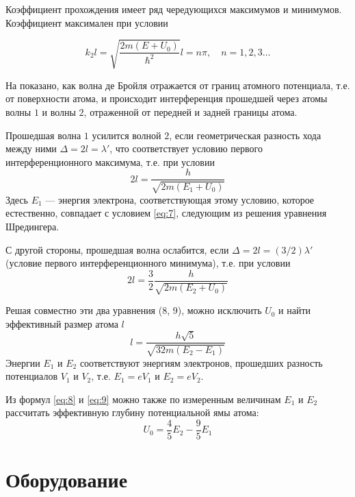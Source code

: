 \documentclass[a4paper, 12pt]{article}
\begin{document}
Коэффициент прохождения имеет ряд чередующихся максимумов и минимумов.
Коэффициент максимален при условии

\begin{equation}
    k_2 l = \sqrt{ \frac{2m (E+U_0)}{\hbar^2} }l = n \pi, \hspace{1em} n =
    1, 2, 3\ldots
    \label{eq:7}
\end{equation}

На  показано, как волна де Бройля отражается от границ
атомного потенциала, т.е. от поверхности атома, и происходит
интерференция прошедшей через атомы волны $1$ и волны $2$, отраженной
от передней и задней границы атома.

Прошедшая волна $1$ усилится волной $2$, если геометрическая разность
хода между ними $\Delta = 2l = \lambda'$, что соответствует условию
первого интерференционного максимума, т.е. при условии
\begin{equation}
    2l = \frac{h}{\sqrt{2m (E_1 + U_0)}}
    \label{eq:8}
\end{equation}
Здесь $E_1$ --- энергия электрона, соответствующая этому условию,
которое естественно, совпадает с условием \eqref{eq:7}, следующим из
решения уравнения Шредингера.

С другой стороны, прошедшая волна ослабится, если $\Delta = 2l =
(3/2)\lambda'$ (условие первого интерференционного минимума), т.е. при
условии 
\begin{equation}
    2l = \frac{3}{2} \frac{h}{\sqrt{2m (E_2 + U_0)}}
    \label{eq:9}
\end{equation}

Решая совместно эти два уравнения (8, 9), можно исключить $U_0$ и
найти эффективный размер атома $l$
\begin{equation}
    l = \frac{h \sqrt{5}}{\sqrt{32m (E_2 - E_1)}}
    \label{eq:10}
\end{equation}
Энергии $E_1$ и $E_2$ соответствуют энергиям электронов, прошедших
разность потенциалов $V_1$ и $V_2$, т.е. $E_1 = e V_1$ и $E_2 = e
V_2$.

Из формул \eqref{eq:8} и \eqref{eq:9} можно также по измеренным величинам
$E_1$ и $E_2$ рассчитать эффективную глубину потенциальной ямы атома:
\begin{equation}
    U_0 = \frac{4}{5} E_2 - \frac{9}{5} E_1
    \label{eq:11}
\end{equation}






\section{Оборудование}
\end{document}
